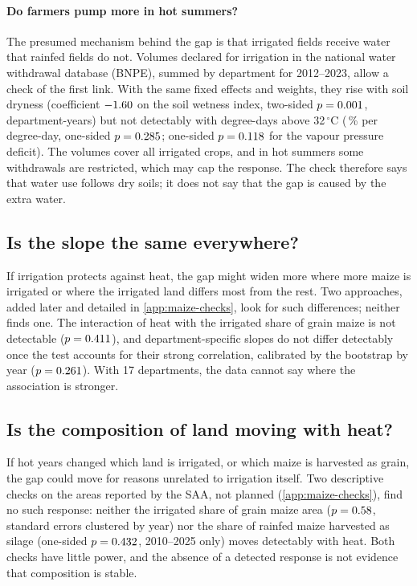\paragraph{Do farmers pump more in hot summers?} The presumed mechanism behind the gap is that irrigated fields receive water that rainfed fields do not. Volumes declared for irrigation in the national water withdrawal database (BNPE), summed by department for 2012--2023, allow a check of the first link. With the same fixed effects and weights, they rise with soil dryness (coefficient $-1.60$ on the soil wetness index, two-sided $p = 0.001$, \VolN{} department-years) but not detectably with degree-days above 32\,$^{\circ}$C (\VolHeatPct\,\% per degree-day, one-sided $p = 0.285$; one-sided $p = 0.118$ for the vapour pressure deficit). The volumes cover all irrigated crops, and in hot summers some withdrawals are restricted, which may cap the response. The check therefore says that water use follows dry soils; it does not say that the gap is caused by the extra water.

\subsection{Is the slope the same everywhere?}
\label{subsec:maize-heterogeneity}

If irrigation protects against heat, the gap might widen more where more maize is irrigated or where the irrigated land differs most from the rest. Two approaches, added later and detailed in \cref{app:maize-checks}, look for such differences; neither finds one. The interaction of heat with the irrigated share of grain maize is not detectable ($p = 0.411$), and department-specific slopes do not differ detectably once the test accounts for their strong correlation, calibrated by the bootstrap by year ($p = 0.261$). With 17 departments, the data cannot say where the association is stronger.

\subsection{Is the composition of land moving with heat?}
\label{subsec:maize-composition}

If hot years changed which land is irrigated, or which maize is harvested as grain, the gap could move for reasons unrelated to irrigation itself. Two descriptive checks on the areas reported by the SAA, not planned (\cref{app:maize-checks}), find no such response: neither the irrigated share of grain maize area ($p = 0.58$, standard errors clustered by year) nor the share of rainfed maize harvested as silage (one-sided $p = 0.432$, 2010--2025 only) moves detectably with heat. Both checks have little power, and the absence of a detected response is not evidence that composition is stable.

